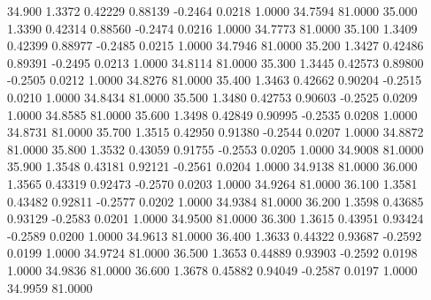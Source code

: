   34.900   1.3372   0.42229   0.88139  -0.2464   0.0218   1.0000  34.7594  81.0000
  35.000   1.3390   0.42314   0.88560  -0.2474   0.0216   1.0000  34.7773  81.0000
  35.100   1.3409   0.42399   0.88977  -0.2485   0.0215   1.0000  34.7946  81.0000
  35.200   1.3427   0.42486   0.89391  -0.2495   0.0213   1.0000  34.8114  81.0000
  35.300   1.3445   0.42573   0.89800  -0.2505   0.0212   1.0000  34.8276  81.0000
  35.400   1.3463   0.42662   0.90204  -0.2515   0.0210   1.0000  34.8434  81.0000
  35.500   1.3480   0.42753   0.90603  -0.2525   0.0209   1.0000  34.8585  81.0000
  35.600   1.3498   0.42849   0.90995  -0.2535   0.0208   1.0000  34.8731  81.0000
  35.700   1.3515   0.42950   0.91380  -0.2544   0.0207   1.0000  34.8872  81.0000
  35.800   1.3532   0.43059   0.91755  -0.2553   0.0205   1.0000  34.9008  81.0000
  35.900   1.3548   0.43181   0.92121  -0.2561   0.0204   1.0000  34.9138  81.0000
  36.000   1.3565   0.43319   0.92473  -0.2570   0.0203   1.0000  34.9264  81.0000
  36.100   1.3581   0.43482   0.92811  -0.2577   0.0202   1.0000  34.9384  81.0000
  36.200   1.3598   0.43685   0.93129  -0.2583   0.0201   1.0000  34.9500  81.0000
  36.300   1.3615   0.43951   0.93424  -0.2589   0.0200   1.0000  34.9613  81.0000
  36.400   1.3633   0.44322   0.93687  -0.2592   0.0199   1.0000  34.9724  81.0000
  36.500   1.3653   0.44889   0.93903  -0.2592   0.0198   1.0000  34.9836  81.0000
  36.600   1.3678   0.45882   0.94049  -0.2587   0.0197   1.0000  34.9959  81.0000

